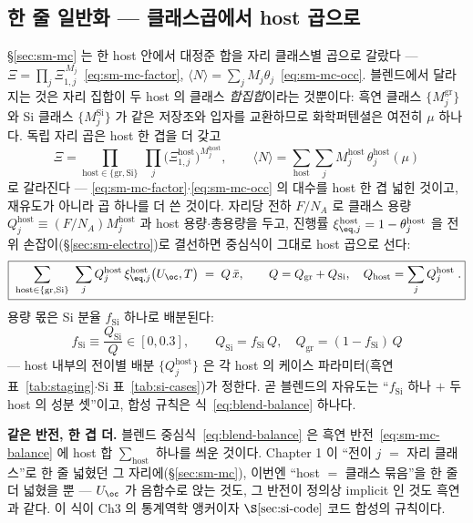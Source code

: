 \subsection{한 줄 일반화 --- 클래스곱에서 host 곱으로}\label{ssec:blend-balance}
\S\ref{sec:sm-mc} 는 한 host 안에서 대정준 합을 자리 클래스별 곱으로 갈랐다
--- $\Xi=\prod_j\Xi_{1,j}^{\,M_j}$~\eqref{eq:sm-mc-factor}, $\langle N\rangle=\sum_jM_j\theta_j$~\eqref{eq:sm-mc-occ}.
블렌드에서 달라지는 것은 자리 집합이 두 host 의 클래스 \emph{합집합}이라는 것뿐이다: 흑연 클래스
$\{M_j^\mathrm{gr}\}$ 와 Si 클래스 $\{M_j^\mathrm{Si}\}$ 가 같은 저장조와 입자를 교환하므로 화학퍼텐셜은
여전히 $\mu$ 하나다. 독립 자리 곱은 host 한 겹을 더 갖고
\begin{equation}
\Xi=\prod_{\mathrm{host}\in\{\mathrm{gr},\mathrm{Si}\}}\ \prod_{j}\bigl(\Xi_{1,j}^{\mathrm{host}}\bigr)^{M_j^{\mathrm{host}}},
\qquad
\langle N\rangle=\sum_{\mathrm{host}}\sum_{j}M_j^{\mathrm{host}}\,\theta_j^{\mathrm{host}}(\mu)
\label{eq:blend-occ}
\end{equation}
로 갈라진다 --- \eqref{eq:sm-mc-factor}$\cdot$\eqref{eq:sm-mc-occ} 의 대수를 host 한 겹 넓힌 것이고,
재유도가 아니라 곱 하나를 더 쓴 것이다. 자리당 전하 $F/N_A$ 로 클래스 용량 $Q_j^{\mathrm{host}}\equiv(F/N_A)M_j^{\mathrm{host}}$
과 host 용량$\cdot$총용량을 두고, 진행률 $\xi_{\eq,j}^{\mathrm{host}}=1-\theta_j^{\mathrm{host}}$ 을
전위 손잡이(\S\ref{sec:sm-electro})로 결선하면 중심식이 그대로 host 곱으로 선다:
\begin{equation}
\boxed{\;\sum_{\mathrm{host}\in\{\mathrm{gr},\mathrm{Si}\}}\ \sum_{j}
Q_j^{\mathrm{host}}\,\xi_{\eq,j}^{\mathrm{host}}\bigl(U_\oc,T\bigr)\;=\;Q\,\bar x,
\qquad
Q=Q_\mathrm{gr}+Q_\mathrm{Si},\quad Q_\mathrm{host}=\sum_j Q_j^{\mathrm{host}}\;.}
\label{eq:blend-balance}
\end{equation}
용량 몫은 Si 분율 $f_\mathrm{Si}$ 하나로 배분된다:
\begin{equation}
f_\mathrm{Si}\equiv\frac{Q_\mathrm{Si}}{Q}\in[0,0.3],
\qquad
Q_\mathrm{Si}=f_\mathrm{Si}\,Q,\quad Q_\mathrm{gr}=(1-f_\mathrm{Si})\,Q
\label{eq:blend-fsi}
\end{equation}
--- host 내부의 전이별 배분 $\{Q_j^{\mathrm{host}}\}$ 은 각 host 의 케이스 파라미터(흑연 표~\ref{tab:staging}$\cdot$Si
표~\ref{tab:si-cases})가 정한다. 곧 블렌드의 자유도는 ``$f_\mathrm{Si}$ 하나 $+$ 두 host 의 성분 셋''이고,
합성 규칙은 식~\eqref{eq:blend-balance} 하나다.

\begin{keybox}
\textbf{같은 반전, 한 겹 더.} 블렌드 중심식~\eqref{eq:blend-balance} 은 흑연 반전~\eqref{eq:sm-mc-balance}
에 host 합 $\sum_\mathrm{host}$ 하나를 씌운 것이다. Chapter 1 이 ``전이 $j$ $=$ 자리 클래스''로 한 줄
넓혔던 그 자리에(\S\ref{sec:sm-mc}), 이번엔 ``host $=$ 클래스 묶음''을 한 줄 더 넓혔을 뿐 ---
$U_\oc$ 가 음함수로 앉는 것도, 그 반전이 정의상 implicit 인 것도 흑연과 같다. 이 식이 Ch3 의 통계역학
앵커이자 $\S\ref{sec:si-code}$ 코드 합성의 규칙이다.
\end{keybox}

